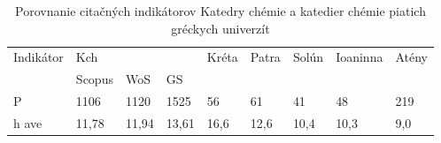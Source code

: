 \begin{table}
  \label{tab:lazaridis.results}
  \caption[Porovnanie Katedry chémie a chemických katedier vybraných gréckych univerzít]
  {Porovnanie citačných indikátorov Katedry chémie a katedier chémie piatich gréckych univerzít \citep{Lazaridis2010}}
\begin{tabular}{lllllll}
\hline
 Indikátor & Kch    &       &       & Kréta & Patra & Solún & Ioaninna & Atény \\
           & Scopus & WoS   & GS    &       &       &       &          &       \\
 P         & 1106   & 1120  & 1525  & 56    & 61    & 41    & 48       & 219   \\
 h ave     & 11,78  & 11,94 & 13,61 & 16,6  & 12,6  & 10,4  & 10,3     & 9,0   \\
\hline
\end{tabular}
\end{table}

